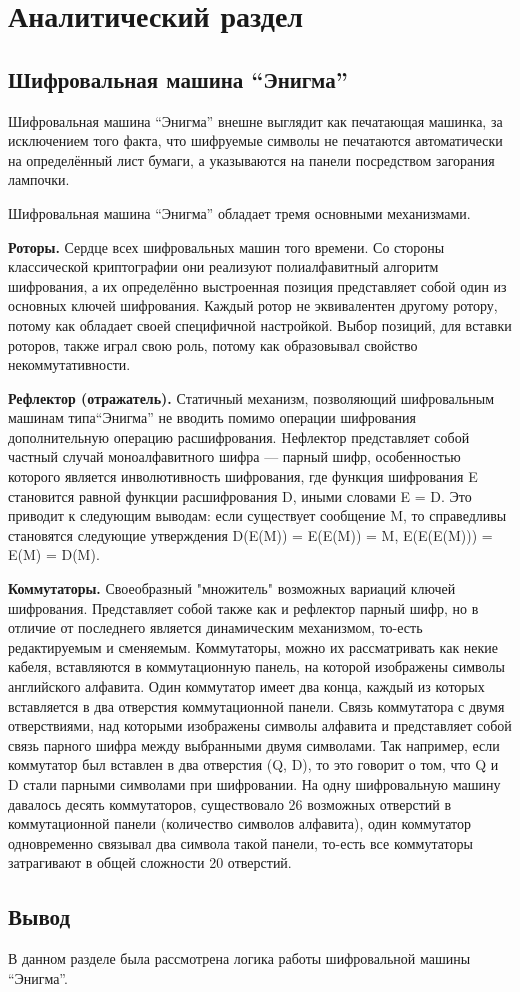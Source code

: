 \chapter{Аналитический раздел}
\label{cha:analysis}

\section{Шифровальная машина ``Энигма''}

Шифровальная машина ``Энигма'' внешне выглядит как печатающая машинка, за исключением того факта, что шифруемые символы не печатаются автоматически на определённый лист бумаги, а указываются на панели посредством загорания лампочки.

Шифровальная машина ``Энигма'' обладает тремя основными механизмами.

\textbf{Роторы.} Сердце всех шифровальных машин того времени. Со стороны классической криптографии они реализуют полиалфавитный алгоритм шифрования, а их определённо выстроенная позиция представляет собой один из основных ключей шифрования. Каждый ротор не эквивалентен другому ротору, потому как обладает своей специфичной настройкой. Выбор позиций, для вставки роторов, также играл свою роль, потому как образовывал свойство некоммутативности.

\textbf{Рефлектор (отражатель).} Статичный механизм, позволяющий шифровальным машинам типа``Энигма'' не вводить помимо операции шифрования дополнительную операцию расшифрования. Hефлектор представляет собой частный случай моноалфавитного шифра — парный шифр, особенностью которого является инволютивность шифрования, где функция шифрования E становится равной функции расшифрования D, иными словами E = D. Это приводит к следующим выводам: если существует сообщение M, то справедливы становятся следующие утверждения D(E(M)) = E(E(M)) = M, E(E(E(M))) = E(M) = D(M). 

\textbf{Коммутаторы.} Своеобразный "множитель" возможных вариаций ключей шифрования. Представляет собой также как и рефлектор парный шифр, но в отличие от последнего является динамическим механизмом, то-есть редактируемым и сменяемым. Коммутаторы, можно их рассматривать как некие кабеля, вставляются в коммутационную панель, на которой изображены символы английского алфавита. Один коммутатор имеет два конца, каждый из которых вставляется в два отверстия коммутационной панели. Связь коммутатора с двумя отверствиями, над которыми изображены символы алфавита и представляет собой связь парного шифра между выбранными двумя символами. Так например, если коммутатор был вставлен в два отверстия (Q, D), то это говорит о том, что Q и D стали парными символами при шифровании. На одну шифровальную машину давалось десять коммутаторов, существовало 26 возможных отверстий в коммутационной панели (количество символов алфавита), один коммутатор одновременно связывал два символа такой панели, то-есть все коммутаторы затрагивают в общей сложности 20 отверстий.

\section*{Вывод}
В данном разделе была рассмотрена логика работы шифровальной машины ``Энигма''.